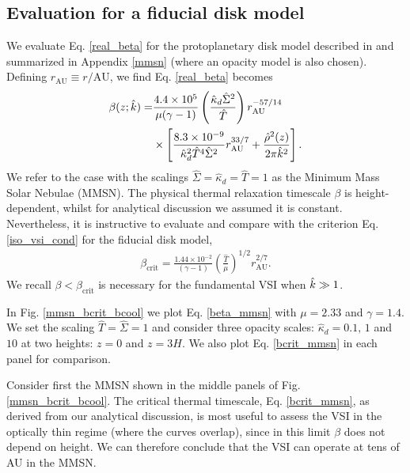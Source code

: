 \subsection{Evaluation for a fiducial disk model}
We evaluate Eq. \ref{real_beta} for the protoplanetary disk model
described in \cite{chiang10} and summarized in Appendix \ref{mmsn}
(where an opacity model is also chosen). Defining $r_\mathrm{AU}\equiv
r/\mathrm{AU}$, we find Eq. \ref{real_beta} becomes
\begin{align}\label{beta_mmsn}
  \beta(z; \hat{k}) =
  &\frac{4.4\times10^5}{\mu(\gamma-1)}\left(\frac{\hat{\kappa}_d\hat{\Sigma}^2}{\hat{T}}\right)r_\mathrm{AU}^{-57/14}\notag\\
&\times\left[\frac{8.3\times10^{-9}}{\hat{\kappa}_d^2\hat{T}^4\hat{\Sigma}^2}r_\mathrm{AU}^{33/7}+\frac{\hat{\rho}^2(z)}{2\pi\hat{k}^2}\right].     
\end{align}
We refer to the case with the scalings
$\hat{\Sigma}=\hat{\kappa}_d=\hat{T}=1$ as the Minimum Mass Solar
Nebulae (MMSN). The physical thermal relaxation timescale
$\beta$ is height-dependent, whilst for analytical discussion we
assumed it is constant. Nevertheless, it is instructive to evaluate
and compare with the criterion Eq. \ref{iso_vsi_cond} for the fiducial  
disk model,  
\begin{align}\label{bcrit_mmsn}
  \beta_\mathrm{crit} = \frac{1.44\times10^{-2}}{(\gamma
    -1)}\left(\frac{\hat{T}}{\mu}\right)^{1/2}r_\mathrm{AU}^{2/7}. 
\end{align}
We recall $\beta < \beta_\mathrm{crit}$ is necessary for the
fundamental VSI when $\hat{k}\gg 1$. %

In Fig. \ref{mmsn_bcrit_bcool} we plot Eq. \ref{beta_mmsn}  with $\mu
=2.33$ and $\gamma=1.4$.  We set the scaling $\hat{T}=\hat{\Sigma}=1$
and consider three opacity scales: $\hat{\kappa}_d=0.1, \,1 $ and $10$
at two heights: $z=0$ and $z=3H$. We also plot Eq. \ref{bcrit_mmsn} in
each panel for comparison. 

Consider first the MMSN shown in the middle panels of
Fig. \ref{mmsn_bcrit_bcool}. The critical thermal timescale,
Eq. \ref{bcrit_mmsn}, as derived from our analytical discussion, is
most useful to assess the VSI in the optically thin regime (where the
curves overlap), since in this limit $\beta$ does not depend on
height. We can therefore conclude that the VSI can operate at tens of
AU in the MMSN. 

